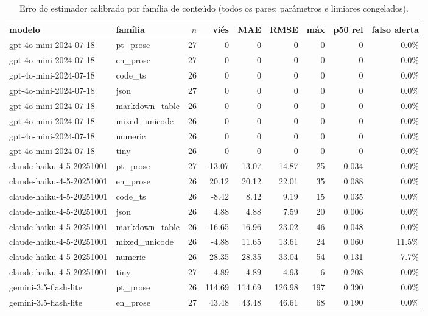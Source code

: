 \begin{table}[htbp]\centering\small
\caption{Erro do estimador calibrado por fam\'ilia de conte\'udo (todos os pares; par\^ametros e limiares congelados).}
\label{tab:r05-family}
\begin{tabular}{llrrrrrrr}
\toprule
modelo & fam\'ilia & $n$ & vi\'es & MAE & RMSE & m\'ax & p50 rel & falso alerta \\
\midrule
gpt-4o-mini-2024-07-18 & pt\_prose & 27 & 0 & 0 & 0 & 0 & 0 & 0.0\% \\
gpt-4o-mini-2024-07-18 & en\_prose & 27 & 0 & 0 & 0 & 0 & 0 & 0.0\% \\
gpt-4o-mini-2024-07-18 & code\_ts & 26 & 0 & 0 & 0 & 0 & 0 & 0.0\% \\
gpt-4o-mini-2024-07-18 & json & 27 & 0 & 0 & 0 & 0 & 0 & 0.0\% \\
gpt-4o-mini-2024-07-18 & markdown\_table & 26 & 0 & 0 & 0 & 0 & 0 & 0.0\% \\
gpt-4o-mini-2024-07-18 & mixed\_unicode & 26 & 0 & 0 & 0 & 0 & 0 & 0.0\% \\
gpt-4o-mini-2024-07-18 & numeric & 26 & 0 & 0 & 0 & 0 & 0 & 0.0\% \\
gpt-4o-mini-2024-07-18 & tiny & 26 & 0 & 0 & 0 & 0 & 0 & 0.0\% \\
claude-haiku-4-5-20251001 & pt\_prose & 27 & -13.07 & 13.07 & 14.87 & 25 & 0.034 & 0.0\% \\
claude-haiku-4-5-20251001 & en\_prose & 26 & 20.12 & 20.12 & 22.01 & 35 & 0.088 & 0.0\% \\
claude-haiku-4-5-20251001 & code\_ts & 26 & -8.42 & 8.42 & 9.19 & 15 & 0.035 & 0.0\% \\
claude-haiku-4-5-20251001 & json & 26 & 4.88 & 4.88 & 7.59 & 20 & 0.006 & 0.0\% \\
claude-haiku-4-5-20251001 & markdown\_table & 26 & -16.65 & 16.96 & 23.02 & 46 & 0.048 & 0.0\% \\
claude-haiku-4-5-20251001 & mixed\_unicode & 26 & -4.88 & 11.65 & 13.61 & 24 & 0.060 & 11.5\% \\
claude-haiku-4-5-20251001 & numeric & 26 & 28.35 & 28.35 & 33.04 & 54 & 0.131 & 7.7\% \\
claude-haiku-4-5-20251001 & tiny & 27 & -4.89 & 4.89 & 4.93 & 6 & 0.208 & 0.0\% \\
gemini-3.5-flash-lite & pt\_prose & 26 & 114.69 & 114.69 & 126.98 & 197 & 0.390 & 0.0\% \\
gemini-3.5-flash-lite & en\_prose & 27 & 43.48 & 43.48 & 46.61 & 68 & 0.190 & 0.0\% \\

\end{tabular}
\end{table}

